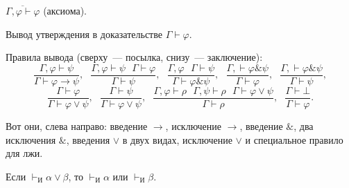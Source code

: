 $\overline{\Gamma, \varphi \vdash \varphi}$ (аксиома).

Вывод утверждения в доказательстве $\Gamma \vdash \varphi$.


Правила вывода (сверху~--- посылка, снизу~--- заключение):
\[
    \dfrac{\Gamma, \varphi \vdash \psi}{\Gamma \vdash \varphi \to \psi},~~~
    \dfrac{\Gamma, \varphi \vdash \psi~~~ \Gamma \vdash \varphi}{\Gamma \vdash \psi},~~~
    \dfrac{\Gamma, \varphi ~~~ \Gamma \vdash \psi}{\Gamma \vdash \varphi \& \psi},~~~
    \dfrac{\Gamma, \vdash \varphi \& \psi}{\Gamma \vdash \varphi},~~~
    \dfrac{\Gamma, \vdash \varphi \& \psi}{\Gamma \vdash \psi},
\]\[
    \dfrac{\Gamma \vdash \varphi}{\Gamma\vdash\varphi \vee \psi},~~~
    \dfrac{\Gamma \vdash \psi}{\Gamma\vdash\varphi \vee \psi},~~~
    \dfrac{\Gamma, \varphi \vdash \rho~~~ \Gamma, \psi \vdash \rho~~~ \Gamma \vdash \varphi \vee \psi}{\Gamma\vdash\rho},~~~
    \dfrac{\Gamma \vdash \bot }{\Gamma\vdash\varphi}.
\]

Вот они, слева направо: введение $\to$, исключение $\to$, введение $\&$, два исключения $\&$, введения $\lor$ в двух видах, исключение $\lor$ и специальное правило для лжи.

\begin{theorem}
    Если $\vdash_\text{И} \alpha \lor \beta$, то $\vdash_\text{И} \alpha$ или $\vdash_\text{И} \beta$.
\end{theorem}
\endinput
